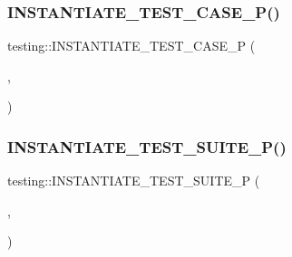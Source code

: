 \mbox{\label{namespacetesting_a5b049e97e9082df909e4a0f740ff5d02}} 
\subsubsection{\texorpdfstring{INSTANTIATE\_TEST\_CASE\_P()}{INSTANTIATE\_TEST\_CASE\_P()}}
{\footnotesize\ttfamily testing\+::\+I\+N\+S\+T\+A\+N\+T\+I\+A\+T\+E\+\_\+\+T\+E\+S\+T\+\_\+\+C\+A\+S\+E\+\_\+P (\begin{DoxyParamCaption}\item[{\mbox{\hyperlink{classtesting_1_1_code_location_for_t_e_s_t_p}{Code\+Location\+For\+T\+E\+S\+TP}}}]{,  }\item[{\mbox{\hyperlink{namespacetesting_abd3c87b40c2a0663691c9b617ed5fcc2}{Values}}(0)}]{ }\end{DoxyParamCaption})}

\mbox{\label{namespacetesting_a91b2d3c4e8c89bcec13270ae8585d549}} 
\subsubsection{\texorpdfstring{INSTANTIATE\_TEST\_SUITE\_P()}{INSTANTIATE\_TEST\_SUITE\_P()}}
{\footnotesize\ttfamily testing\+::\+I\+N\+S\+T\+A\+N\+T\+I\+A\+T\+E\+\_\+\+T\+E\+S\+T\+\_\+\+S\+U\+I\+T\+E\+\_\+P (\begin{DoxyParamCaption}\item[{\mbox{\hyperlink{classtesting_1_1_code_location_for_t_e_s_t_p}{Code\+Location\+For\+T\+E\+S\+TP}}}]{,  }\item[{\mbox{\hyperlink{namespacetesting_abd3c87b40c2a0663691c9b617ed5fcc2}{Values}}(0)}]{ }\end{DoxyParamCaption})}

\mbox{\label{namespacetesting_a111c1dea1140652727ab97ddc13eb045}} 
